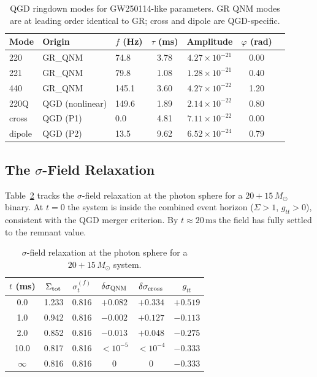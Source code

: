 \documentclass[11pt,a4paper]{article}
\theoremstyle{definition}
\theoremstyle{remark}
\newcommand{\sig}[2]{\sigma_{#1}^{(#2)}}
\begin{document}
	\begin{table}[ht]
		\centering
		\caption{QGD ringdown modes for GW250114-like parameters. GR QNM
			modes are at leading order identical to GR; cross and dipole are
			QGD-specific.}
		\label{tab:gw250114}
		\renewcommand{\arraystretch}{1.4}
		\begin{tabular}{lllcccc}
			\toprule
			Mode & Origin & $f$ (Hz) & $\tau$ (ms) & Amplitude & $\varphi$ (rad) \\
			\midrule
			220   & GR\_QNM        & 74.8  & 3.78 & $4.27\times10^{-21}$ & 0.00 \\
			221   & GR\_QNM        & 79.8  & 1.08 & $1.28\times10^{-21}$ & 0.40 \\
			440   & GR\_QNM        & 145.1 & 3.60 & $4.27\times10^{-22}$ & 1.20 \\
			220Q  & QGD (nonlinear)& 149.6 & 1.89 & $2.14\times10^{-22}$ & 0.80 \\
			cross & QGD (P1)       & 0.0   & 4.81 & $7.11\times10^{-22}$ & 0.00 \\
			dipole& QGD (P2)       & 13.5  & 9.62 & $6.52\times10^{-24}$ & 0.79 \\
			\bottomrule
		\end{tabular}
	\end{table}
	
	\subsection{The $\sigma$-Field Relaxation}
	
	Table~\ref{tab:sigma_relax} tracks the $\sigma$-field relaxation at
	the photon sphere for a $20+15\,M_\odot$ binary.  At $t=0$ the
	system is inside the combined event horizon ($\Sigma>1$, $g_{tt}>0$),
	consistent with the QGD merger criterion.  By $t\approx20\,\mathrm{ms}$
	the field has fully settled to the remnant value.
	
	\begin{table}[ht]
		\centering
		\caption{$\sigma$-field relaxation at the photon sphere for a
			$20+15\,M_\odot$ system.}
		\label{tab:sigma_relax}
		\renewcommand{\arraystretch}{1.4}
		\begin{tabular}{cccccc}
			\toprule
			$t$ (ms) & $\Sigma_{\rm tot}$ & $\sig{t}{f}$ & $\delta\sigma_{\rm QNM}$
			& $\delta\sigma_{\rm cross}$ & $g_{tt}$ \\
			\midrule
			0.0   & 1.233 & 0.816 & $+0.082$ & $+0.334$ & $+0.519$ \\
			1.0   & 0.942 & 0.816 & $-0.002$ & $+0.127$ & $-0.113$ \\
			2.0   & 0.852 & 0.816 & $-0.013$ & $+0.048$ & $-0.275$ \\
			10.0  & 0.817 & 0.816 & $<10^{-5}$ & $<10^{-4}$ & $-0.333$\\
			$\infty$& 0.816 & 0.816 & $0$ & $0$ & $-0.333$ \\
			\bottomrule
		\end{tabular}
	\end{table}
	
\end{document}
